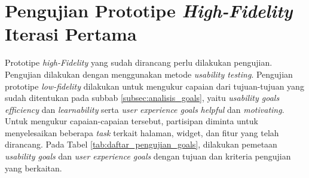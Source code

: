 \section{Pengujian Prototipe \textit{High-Fidelity} Iterasi Pertama}
\label{sec:test_1}

Prototipe \textit{high-Fidelity} yang sudah dirancang perlu dilakukan pengujian. Pengujian dilakukan dengan menggunakan metode \textit{usability testing}. Pengujian prototipe \textit{low-fidelity} dilakukan untuk mengukur capaian dari tujuan-tujuan yang sudah ditentukan pada subbab \ref{subsec:analisis_goals}, yaitu \textit{usability goals} \textit{efficiency} dan \textit{learnability} serta \textit{user experience goals} \textit{helpful} dan \textit{motivating}. Untuk mengukur capaian-capaian tersebut, partisipan diminta untuk menyelesaikan beberapa \textit{task} terkait halaman, widget, dan fitur yang telah dirancang. Pada Tabel \ref{tab:daftar_pengujian_goals}, dilakukan pemetaan \textit{usability goals} dan \textit{user experience goals} dengan tujuan dan kriteria pengujian yang berkaitan.

